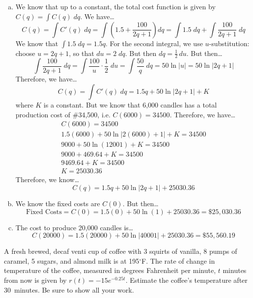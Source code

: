 \documentclass[12pt,letterpaper]{exam}
\begin{document}
\begin{questions}
{\itshape
\begin{enumerate}[(a)]
\item We know that up to a constant, the total cost function is given by $\displaystyle C(q)= \int C(q) \;dq$. We have\dots
	\[
	C(q)= \int C'(q) \;dq= \int \left(1.5 + \dfrac{100}{2q + 1} \right) dq= \int 1.5 \;dq + \int \dfrac{100}{2q + 1}\; dq
	\]
We know that $\displaystyle \int 1.5 \;dq= 1.5q$. For the second integral, we use $u$-substitution: choose $u= 2q + 1$, so that $du= 2\;dq$. But then $dq= \frac{1}{2}\,du$. But then\dots
	\[
	\int \dfrac{100}{2q + 1} \;dq= \int \dfrac{100}{u} \cdot \dfrac{1}{2} \;du= \int \dfrac{50}{q} \;dq= 50 \ln|u|= 50 \ln|2q + 1|
	\]
Therefore, we have\dots
	\[
	C(q)= \int C'(q) \;dq= 1.5q + 50 \ln|2q + 1| + K
	\]
where $K$ is a constant. But we know that 6,000 candles has a total production cost of \#34,500, i.e. $C(6000)= 34500$. Therefore, we have\dots
	\[
	\begin{gathered}
	C(6000)= 34500 \\
	1.5(6000) + 50 \ln|2(6000) + 1| + K= 34500 \\
	9000 + 50 \ln(12001) + K= 34500 \\
	9000 + 469.64 + K= 34500 \\
	9469.64 + K= 34500 \\
	K= 25030.36
	\end{gathered}
	\]
Therefore, we know\dots
	\[
	C(q)= 1.5q + 50 \ln|2q + 1| + 25030.36
	\]

\item We know the fixed costs are $C(0)$. But then\dots
	\[
	\text{Fixed Costs}= C(0)= 1.5(0) + 50 \ln(1) + 25030.36= \$25,\!030.36 
	\]

\item The cost to produce 20,000 candles is\dots
	\[
	C(20000)= 1.5(20000) + 50 \ln|40001| + 25030.36= \$55,\!560.19
	\]
\end{enumerate}
}



\newpage
\question[10] A fresh brewed, decaf venti cup of coffee with 3 squirts of vanilla, 8 pumps of caramel, 5 sugars, and almond milk is at 195$^\circ$F. The rate of change in temperature of the coffee, measured in degrees Fahrenheit per minute, $t$ minutes from now is given by $r(t)= -15 e^{-0.25t}$. Estimate the coffee's temperature after 30~minutes. Be sure to show all your work. \pspace


\end{questions}
\end{document}
